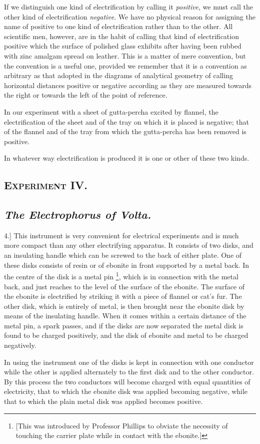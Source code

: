\documentclass[12pt,oneside]{book}[2021/10/04]
\let\oldfootnote\footnote
\renewcommand\footnote[1]{%
\oldfootnote{\hspace{0.14em}#1}}
\newcommand{\Heading}{\centering\normalfont}
\newcommand{\Section}[1]{\subsection*{\normalsize\Heading\scshape #1}}
\newcommand{\Subsection}[1]{\subsection*{\normalsize\Heading\itshape #1}}
\newcommand{\Runhead}[1]{\fancyhead[C]{\iffloatpage{}{\small#1}}}
\newcommand{\article}[1]{\phantomsection \label{art:#1}{#1.]}}
\newcommand{\¬}{\hphantom{0}}
\begin{document}
If we distinguish one kind of electrification by calling it \textit{positive},
we must call the other kind of electrification \textit{negative}. We have
no physical reason for assigning the name of positive to one kind
of electrification rather than to the other. All scientific men,
however, are in the habit of calling that kind of electrification
positive which the surface of polished glass exhibits after having
been rubbed with zinc amalgam spread on leather. This is a
matter of mere convention, but the convention is a useful one,
provided we remember that it is a convention as arbitrary as
that adopted in the diagrams of analytical geometry of calling
horizontal distances positive or negative according as they are
measured towards the right or towards the left of the point of
reference.

In our experiment with a sheet of gutta-percha excited by
flannel, the electrification of the sheet and of the tray on which
it is placed is negative; that of the flannel and of the tray from
which the gutta-percha has been removed is positive.

In whatever way electrification is produced it is one or other of
these two kinds.

\Section{Experiment IV.}
\Subsection{The Electrophorus of Volta.}

\article{4}
This instrument is very convenient for electrical experiments
and is much more compact than any other electrifying apparatus.
It consists of two disks, and an insulating handle which can be
screwed to the back of either plate. One of these disks consists
of resin or of ebonite in front supported by a metal back. In the
centre of the disk is a metal pin\footnote{
[This was introduced by Professor Phillips to obviate the necessity of touching
the carrier plate while in contact with the ebonite.]
}, which is in connection with the
metal back, and just reaches to the level of the surface of the
ebonite. The surface of the ebonite is electrified by striking it
with a piece of flannel or cat's fur. The other disk, which is
entirely of metal, is then brought near the ebonite disk by means
of the insulating handle. When it comes within a certain distance
of the metal pin, a spark passes, and if the disks are now separated
the metal disk is found to be charged positively, and the disk of
ebonite and metal to be charged negatively.

In using the instrument one of the disks is kept in connection
with one conductor while the other is applied alternately to the
first disk and to the other conductor. By this process the two
conductors will become charged with equal quantities of electricity,
that to which the ebonite disk was applied becoming negative,
while that to which the plain metal disk was applied becomes
positive.
\Runhead{THE ELECTROPHORUS.}
\end{document}
